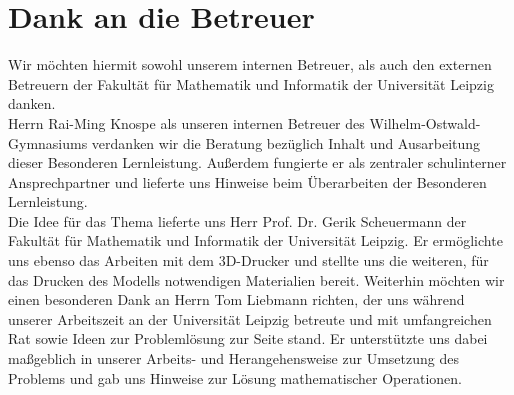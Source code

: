 \cfoot{}
\chapter*{Dank an die Betreuer}
Wir möchten hiermit sowohl unserem internen Betreuer, als auch den externen Betreuern der Fakultät für Mathematik und Informatik der Universität Leipzig danken. \\
Herrn Rai-Ming Knospe als unseren internen Betreuer des Wilhelm-Ostwald-Gymnasiums verdanken wir die Beratung bezüglich Inhalt und Ausarbeitung dieser Besonderen Lernleistung.
Außerdem fungierte er als zentraler schulinterner Ansprechpartner und lieferte uns Hinweise beim Überarbeiten der Besonderen Lernleistung. \\
Die Idee für das Thema lieferte uns Herr Prof. Dr. Gerik Scheuermann der Fakultät für Mathematik und Informatik der Universität Leipzig.
Er ermöglichte uns ebenso das Arbeiten mit dem 3D-Drucker und stellte uns die weiteren, für das Drucken des Modells notwendigen Materialien bereit.
Weiterhin möchten wir einen besonderen Dank an Herrn Tom Liebmann richten, der uns während unserer Arbeitszeit an der Universität Leipzig betreute und mit umfangreichen Rat sowie Ideen zur Problemlösung zur Seite stand.
Er unterstützte uns dabei maßgeblich in unserer Arbeits- und Herangehensweise zur Umsetzung des Problems und gab uns Hinweise zur Lösung mathematischer Operationen.